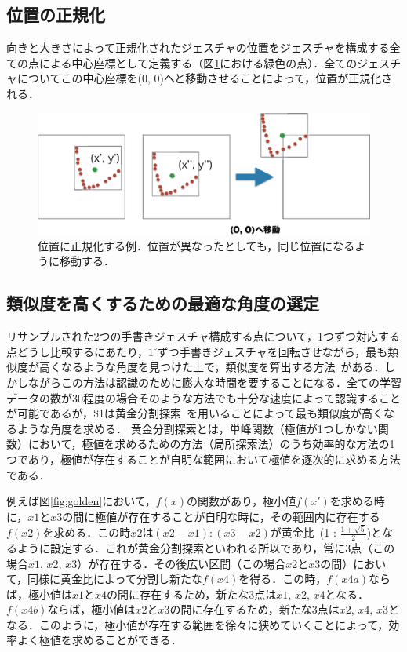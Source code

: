 \subsection{位置の正規化}
向きと大きさによって正規化されたジェスチャの位置をジェスチャを構成する全ての点による中心座標として定義する（図\ref{fig:position}における緑色の点）．全てのジェスチャについてこの中心座標を(0, 0)へと移動させることによって，位置が正規化される．

\begin{figure} [!h]
\centering
\includegraphics [width=0.8\columnwidth]{img/position.eps}
\caption{位置に正規化する例．位置が異なったとしても，同じ位置になるように移動する．}
\label{fig:position}
\end{figure}

\subsection{類似度を高くするための最適な角度の選定}
リサンプルされた2つの手書きジェスチャ構成する点について，1つずつ対応する点どうし比較するにあたり，$1^\circ$ずつ手書きジェスチャを回転させながら，最も類似度が高くなるような角度を見つけた上で，類似度を算出する方法~\cite{Kara:2005:ITS:1652319.1652712}がある．しかしながらこの方法は認識のために膨大な時間を要することになる．全ての学習データの数が30程度の場合そのような方法でも十分な速度によって認識することが可能であるが，\$1は黄金分割探索~\cite{Press:1992:NRC:148286}を用いることによって最も類似度が高くなるような角度を求める．
黄金分割探索とは，単峰関数（極値が1つしかない関数）において，極値を求めるための方法（局所探索法）のうち効率的な方法の1つであり，極値が存在することが自明な範囲において極値を逐次的に求める方法である．

例えば図\ref{fig:golden}において，$f(x)$の関数があり，極小値$f(x')$を求める時に，$x1$と$x3$の間に極値が存在することが自明な時に，その範囲内に存在する$f(x2)$を求める．この時$x2$は$(x2 - x1) : (x3 - x2)$が黄金比~(1 : $\frac{1+\sqrt{5}}{2}$)となるように設定する．これが黄金分割探索といわれる所以であり，常に3点（この場合$x1$, $x2$, $x3$）が存在する．その後広い区間（この場合$x2$と$x3$の間）において，同様に黄金比によって分割し新たな$f(x4)$を得る．この時，$f(x4a)$ならば，極小値は$x1$と$x4$の間に存在するため，新たな3点は$x1$, $x2$, $x4$となる．$f(x4b)$ならば，極小値は$x2$と$x3$の間に存在するため，新たな3点は$x2$, $x4$, $x3$となる．このように，極小値が存在する範囲を徐々に狭めていくことによって，効率よく極値を求めることができる．

